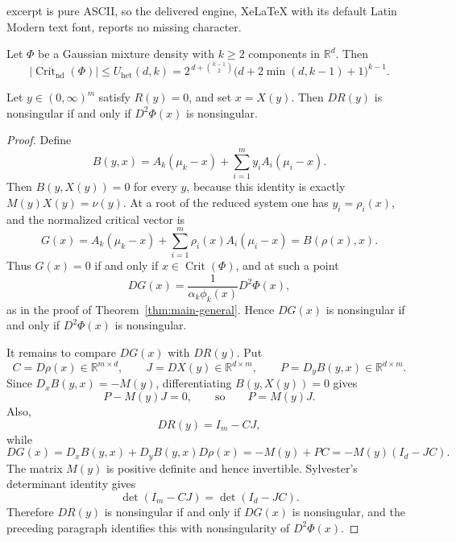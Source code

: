 \documentclass[10pt,a4paper]{amsart}
\DeclareMathOperator{\Crit}{Crit}
\newcommand{\R}{\mathbb{R}}
\begin{document}
excerpt is pure ASCII, so the delivered engine, XeLaTeX with its default Latin Modern text font, reports no missing character.
\begin{theorem}\label{thm:main-general}
Let $\Phi$ be a Gaussian mixture density with $k\ge 2$ components in $\R^d$. Then
\[
|\Crit_{\mathrm{nd}}(\Phi)|\le U_{\mathrm{het}}(d,k)=2^{\,d+\binom{k-1}{2}}\bigl(d+2\min(d,k-1)+1\bigr)^{k-1}.
\]
\end{theorem}

\begin{proposition}\label{prop:reduced-jacobian-hessian}
Let $y\in(0,\infty)^m$ satisfy $R(y)=0$, and set $x=X(y)$. Then $DR(y)$ is nonsingular if and only if $D^2\Phi(x)$ is nonsingular.
\end{proposition}

\begin{proof}
Define
\[
B(y,x)=A_k(\mu_k-x)+\sum_{i=1}^m y_iA_i(\mu_i-x).
\]
Then $B(y,X(y))=0$ for every $y$, because this identity is exactly $M(y)X(y)=\nu(y)$. At a root of the reduced system one has $y_i=\rho_i(x)$, and the normalized critical vector is
\[
G(x)=A_k(\mu_k-x)+\sum_{i=1}^m\rho_i(x)A_i(\mu_i-x)=B(\rho(x),x).
\]
Thus $G(x)=0$ if and only if $x\in\Crit(\Phi)$, and at such a point
\[
DG(x)=\frac{1}{\alpha_k\phi_k(x)}D^2\Phi(x),
\]
as in the proof of Theorem~\ref{thm:main-general}. Hence $DG(x)$ is nonsingular if and only if $D^2\Phi(x)$ is nonsingular.

It remains to compare $DG(x)$ with $DR(y)$. Put
\[
C=D\rho(x)\in\R^{m\times d},
\qquad
J=DX(y)\in\R^{d\times m},
\qquad
P=D_yB(y,x)\in\R^{d\times m}.
\]
Since $D_xB(y,x)=-M(y)$, differentiating $B(y,X(y))=0$ gives
\[
P-M(y)J=0,
\qquad\text{so}\qquad P=M(y)J.
\]
Also,
\[
DR(y)=I_m-CJ,
\]
while
\[
DG(x)=D_xB(y,x)+D_yB(y,x)D\rho(x)=-M(y)+PC
       =-M(y)(I_d-JC).
\]
The matrix $M(y)$ is positive definite and hence invertible. Sylvester's determinant identity gives
\[
\det(I_m-CJ)=\det(I_d-JC).
\]
Therefore $DR(y)$ is nonsingular if and only if $DG(x)$ is nonsingular, and the preceding paragraph identifies this with nonsingularity of $D^2\Phi(x)$.
\end{proof}
\end{document}

